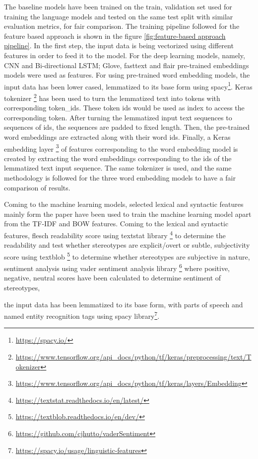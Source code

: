 The baseline models have been trained on the train, validation set used for training the language models and tested on the same test split with similar evaluation metrics, for fair comparison. The training pipeline followed for the feature based approach is shown in the figure \ref{fig:feature-based approach pipeline}. In the first step, the input data is being vectorized using different features in order to feed it to the model. For the deep learning models, namely, CNN and Bi-directional LSTM; Glove, fasttext and flair pre-trained embeddings models were used as features. For using pre-trained word embedding models, the input data has been lower cased, lemmatized to its base form using spacy\footnote{\url{https://spacy.io/}}. Keras tokenizer \footnote{\url{https://www.tensorflow.org/api_docs/python/tf/keras/preprocessing/text/Tokenizer}} has been used to turn the lemmatized text into tokens with corresponding token\_ids. These token ids would be used as index to access the corresponding token. After turning the lemmatized input text sequences to sequences of ids, the sequences are padded to fixed length. Then, the pre-trained word embeddings are extracted along with their word ids. Finally, a Keras embedding layer \footnote{\url{https://www.tensorflow.org/api_docs/python/tf/keras/layers/Embedding}} of features corresponding to the word embedding model is created by extracting the word embeddings corresponding to the ids of the lemmatized text input sequence. The same tokenizer is used, and the same methodology is followed for the three word embedding models to have a fair comparison of results.

Coming to the machine learning models, selected lexical and syntactic features  mainly form the paper \cite{recasens2013linguistic}  have been used to train the machine learning model apart from the TF-IDF and BOW features. Coming to the lexical and syntactic features, flesch readability score \cite{flesch1948new} using textstat library \footnote{\url{https://textstat.readthedocs.io/en/latest/}} to determine the readability and test whether stereotypes are explicit/overt or subtle, subjectivity score using textblob \footnote{\url{https://textblob.readthedocs.io/en/dev/}} to determine whether stereotypes are subjective in nature, sentiment analysis using vader sentiment analysis library \footnote{\url{https://github.com/cjhutto/vaderSentiment}} where positive, negative, neutral scores have been calculated to determine sentiment of stereotypes, 

the input data has been lemmatized to its base form, with parts of speech and named entity recognition tags using spacy library\footnote{\url{https://spacy.io/usage/linguistic-features}}. 

